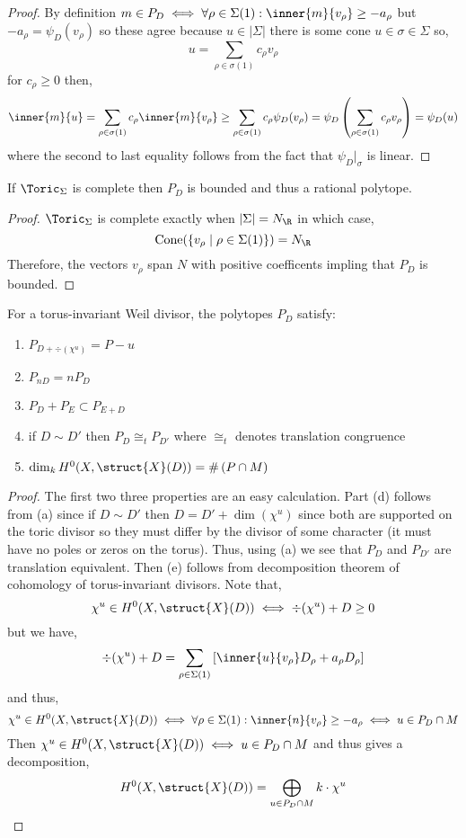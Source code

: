 \documentclass[12pt]{article}
\begin{document}
\begin{proof}
By definition $m \in P_D \iff \forall \rho \in \Sigma(1) : \inner{m}{v_\rho} \ge - a_\rho$ but $-a_\rho = \psi_D(v_\rho)$ so these agree because $u \in |\Sigma|$ there is some cone $u \in \sigma \in \Sigma$ so,
\[ u = \sum_{\rho \in \sigma(1)} c_\rho v_\rho \]
for $c_\rho \ge 0$ then,
\[ \inner{m}{u} = \sum_{\rho \in \sigma(1)} c_\rho \inner{m}{v_\rho} \ge \sum_{\rho \in \sigma(1)} c_\rho \psi_D(v_\rho) = \psi_D \left( \sum_{\rho \in \sigma(1)} c_\rho v_\rho \right) = \psi_D(u) \]
where the second to last equality follows from the fact that $\psi_D |_\sigma$ is linear. 
\end{proof}

\begin{proposition}
If $\Toric_\Sigma$ is complete then $P_D$ is bounded and thus a rational polytope. 
\end{proposition}

\begin{proof}
$\Toric_\Sigma$ is complete exactly when $|\Sigma| = N_\R$ in which case,
\[ \mathrm{Cone}(\{ v_\rho \mid \rho \in \Sigma(1) \}) = N_\R \]
Therefore, the vectors $v_\rho$ span $N$ with positive coefficents impling that $P_D$ is bounded.
\end{proof}

\begin{proposition}
For a torus-invariant Weil divisor, the polytopes $P_D$ satisfy:
\begin{enumerate}
\item $P_{D + \div{(\chi^u)}} = P - u$
\item $P_{n D} = n P_D$
\item $P_{D} + P_{E} \subset P_{E + D}$
\item if $D \sim D'$ then $P_D \cong_t P_{D'}$ where $\cong_t$ denotes translation congruence
\item $\dim_k H^0(X, \struct{X}(D)) = \# \left( P \cap M \right)$
\end{enumerate}
\end{proposition}

\begin{proof}
The first two three properties are an easy calculation. Part (d) follows from (a) since if $D \sim D'$ then $D = D' + \dim{(\chi^u)}$ since both are supported on the toric divisor so they must differ by the divisor of some character (it must have no poles or zeros on the torus). Thus, using (a) we see that $P_D$ and $P_{D'}$ are translation equivalent. Then (e) follows from decomposition theorem of cohomology of torus-invariant divisors. Note that,
\[ \chi^u \in H^0(X, \struct{X}(D)) \iff \div{(\chi^u)} + D \ge 0 \]
but we have,
\[ \div{(\chi^u)} + D = \sum_{\rho \in \Sigma(1)} \left[ \inner{u}{v_\rho} D_\rho + a_\rho D_\rho \right] \]
and thus,
\[ \chi^u \in H^0(X, \struct{X}(D)) \iff \forall \rho \in \Sigma(1) : \inner{n}{v_\rho} \ge -a_\rho \iff u \in P_D \cap M \] 
Then $\chi^u \in H^0(X, \struct{X}(D)) \iff u \in P_D \cap M$ and thus gives a decomposition,
\[ H^0(X, \struct{X}(D)) = \bigoplus_{u \in P_D \cap M} k \cdot \chi^u \]
\end{proof} 
\end{document}
